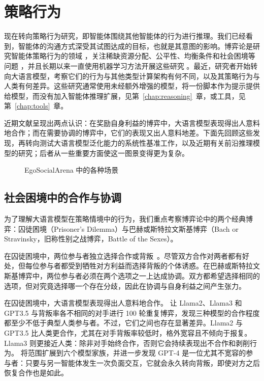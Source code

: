 \section{策略行为} \label{sec:strategic}
现在转向策略行为研究，即智能体围绕其他智能体的行为进行推理。我们已经看到，智能体的沟通方式深受其试图达成的目标，也就是其意图的影响。博弈论是研究智能体策略行为的领域 \citep{von2007theory}，关注稀缺资源分配、公平性、均衡条件和社会困境等问题 \citep{jones2000game}，并且长期以来一直使用机器学习方法开展这些研究 \citep{fatima2024learning}。最近，研究者开始转向大语言模型，考察它们的行为与其他类型计算架构有何不同，以及其策略行为与人类有何差异。这些研究通常使用未经额外增强的模型，将一份脚本作为提示提供给模型，而没有加入智能体推理扩展，见第~\ref{chap:reasoning}~章，或工具，见第~\ref{chap:tools}~章。

近期文献呈现出两点认识：在奖励自身利益的博弈中，大语言模型表现得出人意料地合作；而在需要协调的博弈中，它们的表现又出人意料地差。下面先回顾这些发现，再转向测试大语言模型泛化能力的系统性基准工作，以及近期有关前沿推理模型的研究；后者从一些重要方面使这一图景变得更为复杂。

\begin{figure}
  \begin{center}
    
    \caption{EgoSocialArena 中的各种场景 \citep{hou2024entering}}\label{fig:egosocialarena}
  \end{center}
\end{figure}

\subsection{社会困境中的合作与协调}
为了理解大语言模型在策略情境中的行为，我们重点考察博弈论中的两个经典博弈：囚徒困境（Prisoner's Dilemma）与巴赫或斯特拉文斯基博弈（Bach or Stravinsky，旧称性别之战博弈，Battle of the Sexes）。

在囚徒困境中，两位参与者独立选择合作或背叛~\citep{axelrod1987evolution}。尽管双方合作对两者都有好处，但每位参与者都受到牺牲对方利益而选择背叛的个体诱惑。在巴赫或斯特拉文斯基博弈中，两位参与者必须在两个选项之一上达成协调。双方都希望选择相同的选项，但对究竟选择哪一个存在分歧，因此在协调与自身利益之间产生张力。

在囚徒困境中，大语言模型表现得出人意料地合作。\citet{fontana2025nicer} 让 Llama2、Llama3 和 GPT3.5 与背叛率各不相同的对手进行 100 轮重复博弈，发现三种模型的合作程度都至少不低于典型人类参与者。不过，它们之间也存在显著差异。Llama2 与 GPT3.5 比人类更合作，尤其在对手背叛率较低时，格外宽容且不倾向于报复。Llama3 则更接近人类：除非对手始终合作，否则它会持续表现出不合作和剥削行为。\citet{akata2025playing} 将范围扩展到六个模型家族，并进一步发现 GPT-4 是一位尤其不宽容的参与者：只要与另一智能体发生一次负面交互，它就会永久转向背叛，即使对方之后恢复合作也是如此。

